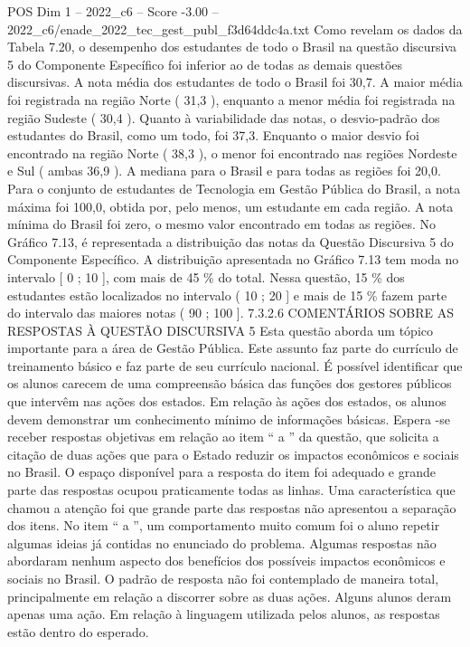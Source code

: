 \begin{textsample}{POS Dim 1 – 2022\_c6 – Score -3.00 – 2022\_c6/enade\_2022\_tec\_gest\_publ\_f3d64ddc4a.txt}
Como revelam os dados da Tabela 7.20, o desempenho dos estudantes de todo o Brasil na questão discursiva 5 do Componente Específico foi inferior ao de todas as demais questões discursivas.
A nota média dos estudantes de todo o Brasil foi 30,7.
A maior média foi registrada na região Norte ( 31,3 ), enquanto a menor média foi registrada na região Sudeste ( 30,4 ).
Quanto à variabilidade das notas, o desvio-padrão dos estudantes do Brasil, como um todo, foi 37,3.
Enquanto o maior desvio foi encontrado na região Norte ( 38,3 ), o menor foi encontrado nas regiões Nordeste e Sul ( ambas 36,9 ).
A mediana para o Brasil e para todas as regiões foi 20,0.
Para o conjunto de estudantes de Tecnologia em Gestão Pública do Brasil, a nota máxima foi 100,0, obtida por, pelo menos, um estudante em cada região.
A nota mínima do Brasil foi zero, o mesmo valor encontrado em todas as regiões.
No Gráfico 7.13, é representada a distribuição das notas da Questão Discursiva 5 do Componente Específico.
A distribuição apresentada no Gráfico 7.13 tem moda no intervalo [ 0 ; 10 ], com mais de 45 \% do total.
Nessa questão, 15 \% dos estudantes estão localizados no intervalo ( 10 ; 20 ] e mais de 15 \% fazem parte do intervalo das maiores notas ( 90 ; 100 ]. 7.3.2.6 COMENTÁRIOS SOBRE AS RESPOSTAS À QUESTÃO DISCURSIVA 5 Esta questão aborda um tópico importante para a área de Gestão Pública.
Este assunto faz parte do currículo de treinamento básico e faz parte de seu currículo nacional.
É possível identificar que os alunos carecem de uma compreensão básica das funções dos gestores públicos que intervêm nas ações dos estados.
Em relação às ações dos estados, os alunos devem demonstrar um conhecimento mínimo de informações básicas.
Espera -se receber respostas objetivas em relação ao item “ a ” da questão, que solicita a citação de duas ações que para o Estado reduzir os impactos econômicos e sociais no Brasil.
O espaço disponível para a resposta do item foi adequado e grande parte das respostas ocupou praticamente todas as linhas.
Uma característica que chamou a atenção foi que grande parte das respostas não apresentou a separação dos itens.
No item “ a ”, um comportamento muito comum foi o aluno repetir algumas ideias já contidas no enunciado do problema.
Algumas respostas não abordaram nenhum aspecto dos benefícios dos possíveis impactos econômicos e sociais no Brasil.
O padrão de resposta não foi contemplado de maneira total, principalmente em relação a discorrer sobre as duas ações.
Alguns alunos deram apenas uma ação.
Em relação à linguagem utilizada pelos alunos, as respostas estão dentro do esperado.

\end{textsample}
